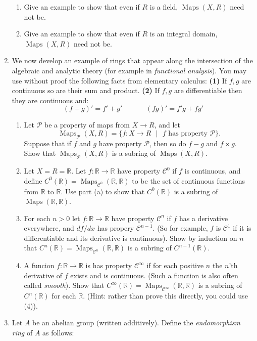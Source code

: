 \documentclass[11pt]{article}
\newcommand{\maps}{\operatorname{Maps}}
\newcommand{\bR}{\mathbb{R}}
\newcommand{\sC}{\mathscr{C}}
\newcommand{\sP}{\mathscr{P}}
\begin{document}
\begin{enumerate}
{\begin{enumerate}
{    }
    \item{
    Give an example to show that even if $R$ is a field, $\maps(X,R)$ need not be.
    }
    \item{
    Give an example to show that even if $R$ is an integral domain, $\maps(X,R)$ need not be.
    }
  \end{enumerate}
  }
  \item{
  We now develop an example of rings that appear along the intersection of the algebraic and analytic theory (for example in \textit{functional analysis}).  You may use without proof the following facts from elementary calculus: \textbf{(1)} If $f,g$ are continuous so are their sum and product.  \textbf{(2)} If $f,g$ are differentiable then they are continuous and:
  \[(f+g)' = f'+g'\hspace{40pt}(fg)' = f'g+fg'\]
  \begin{enumerate}
    \item{
    Let $\sP$ be a property of maps from $X\to R$, and let
    \[\maps_\sP(X,R) = \{f:X\to R\text{ }|\text{ }f\text{ has property }\sP\}.\]
    Suppose that if $f$ and $g$ have property $\sP$, then so do $f-g$ and $f\times g$.  Show that $\maps_\sP(X,R)$ is a subring of $\maps(X,R)$.
    }
    \item{
    Let $X = R = \bR$.  Let $f:\bR\to\bR$ have property $\sC^0$ if $f$ is continuous, and define $C^0(\bR) = \maps_{\sC^0}(\bR,\bR)$ to be the set of continuous functions from $\bR$ to $\bR$.  Use part (a) to show that $C^0(\bR)$ is a subring of $\maps(\bR,\bR)$.
    }
    \item{
    For each $n>0$ let $f:\bR\to\bR$ have property $\sC^n$ if $f$ has a derivative everywhere, and $df/dx$ has propery $\sC^{n-1}$.  (So for example, $f$ is $\sC^1$ if it is differentiable and its derivative is continuous). Show by induction on $n$ that $C^n(\bR) = \maps_{\sC^n}(\bR,\bR)$ is a subring of $C^{n-1}(\bR)$.
    }
    \item{
    A funcion $f:\bR\to\bR$ is has property $\sC^\infty$ if for each positive $n$ the $n$'th derivative of $f$ exists and is continuous.  (Such a function is also often called \textit{smooth}).  Show that $C^\infty(\bR) = \maps_{\sC^{\infty}}(\bR,\bR)$ is a subring of $C^{n}(\bR)$ for each $\bR$.  (Hint: rather than prove this directly, you could use (4)).
    }
  \end{enumerate}
  }
  \item{
  Let $A$ be an abelian group (written additively).  Define the \textit{endomorphism ring} of $A$ as follows:
}
\end{enumerate}
\end{document}
